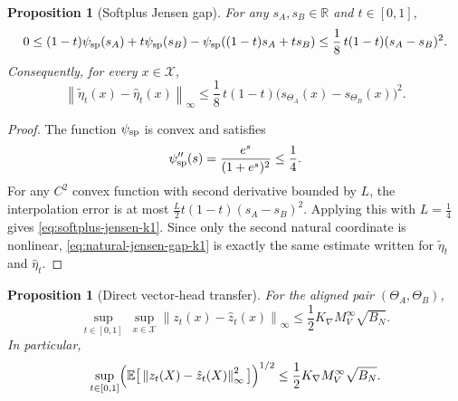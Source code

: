 \documentclass[11pt]{article}
\newtheorem{proposition}[theorem]{Proposition}
\theoremstyle{definition}
\newcommand{\R}{\mathbb{R}}
\newcommand{\E}{\mathbb{E}}
\newcommand{\norm}[1]{\left\lVert #1 \right\rVert}
\newcommand{\mc}[1]{\mathcal{#1}}
\begin{document}
\begin{proposition}[Softplus Jensen gap]
\label{prop:softplus-jensen-k1}
For any $s_A,s_B\in\R$ and $t\in[0,1]$,
\begin{equation}
  0
  \le
  (1-t)\psi_{\rm sp}(s_A)+t\psi_{\rm sp}(s_B)
  -
  \psi_{\rm sp}((1-t)s_A+ts_B)
  \le
  \frac18\,t(1-t)(s_A-s_B)^2.
  \label{eq:softplus-jensen-k1}
\end{equation}
Consequently, for every $x\in\mc{X}$,
\begin{equation}
  \norm{\tilde\eta_t(x)-\hat\eta_t(x)}_\infty
  \le
  \frac18\,t(1-t)\bigl(s_{\Theta_A}(x)-s_{\Theta_B}(x)\bigr)^2.
  \label{eq:natural-jensen-gap-k1}
\end{equation}
\end{proposition}

\begin{proof}
The function $\psi_{\rm sp}$ is convex and satisfies
\[
  \psi''_{\rm sp}(s)=\frac{e^s}{(1+e^s)^2}\le \frac14.
\]
For any $C^2$ convex function with second derivative bounded by $L$, the
interpolation error is at most $\frac{L}{2}t(1-t)(s_A-s_B)^2$. Applying this
with $L=\frac14$ gives \eqref{eq:softplus-jensen-k1}. Since only the second
natural coordinate is nonlinear, \eqref{eq:natural-jensen-gap-k1} is exactly
the same estimate written for $\tilde\eta_t$ and $\hat\eta_t$.
\end{proof}

\begin{proposition}[Direct vector-head transfer]
\label{prop:vector-head-transfer-k1}
For the aligned pair $(\Theta_A,\Theta_B)$,
\begin{equation}
  \sup_{t\in[0,1]}\ \sup_{x\in\mc{X}}
  \norm{z_t(x)-\hat z_t(x)}_\infty
  \le
  \frac12 K_{\nabla}M_V^\infty\sqrt{B_N}.
  \label{eq:vector-transfer-k1}
\end{equation}
In particular,
\[
  \sup_{t\in[0,1]}
  \Bigl(
    \E\big[\norm{z_t(X)-\hat z_t(X)}_\infty^2\big]
  \Bigr)^{1/2}
  \le
  \frac12 K_{\nabla}M_V^\infty\sqrt{B_N}.
\]
\end{proposition}
\end{document}
